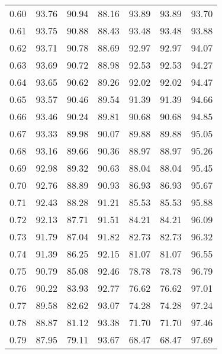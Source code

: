 \begin{tabular}{|c|c|c|c|c|c|c|}
      0.60 &     93.76 &     90.94 &      88.16 &   93.89 &      93.89 &         93.70 \\
      0.61 &     93.75 &     90.88 &      88.43 &   93.48 &      93.48 &         93.88 \\
      0.62 &     93.71 &     90.78 &      88.69 &   92.97 &      92.97 &         94.07 \\
      0.63 &     93.69 &     90.72 &      88.98 &   92.53 &      92.53 &         94.27 \\
      0.64 &     93.65 &     90.62 &      89.26 &   92.02 &      92.02 &         94.47 \\
      0.65 &     93.57 &     90.46 &      89.54 &   91.39 &      91.39 &         94.66 \\
      0.66 &     93.46 &     90.24 &      89.81 &   90.68 &      90.68 &         94.85 \\
      0.67 &     93.33 &     89.98 &      90.07 &   89.88 &      89.88 &         95.05 \\
      0.68 &     93.16 &     89.66 &      90.36 &   88.97 &      88.97 &         95.26 \\
      0.69 &     92.98 &     89.32 &      90.63 &   88.04 &      88.04 &         95.45 \\
      0.70 &     92.76 &     88.89 &      90.93 &   86.93 &      86.93 &         95.67 \\
      0.71 &     92.43 &     88.28 &      91.21 &   85.53 &      85.53 &         95.88 \\
      0.72 &     92.13 &     87.71 &      91.51 &   84.21 &      84.21 &         96.09 \\
      0.73 &     91.79 &     87.04 &      91.82 &   82.73 &      82.73 &         96.32 \\
      0.74 &     91.39 &     86.25 &      92.15 &   81.07 &      81.07 &         96.55 \\
      0.75 &     90.79 &     85.08 &      92.46 &   78.78 &      78.78 &         96.79 \\
      0.76 &     90.22 &     83.93 &      92.77 &   76.62 &      76.62 &         97.01 \\
      0.77 &     89.58 &     82.62 &      93.07 &   74.28 &      74.28 &         97.24 \\
      0.78 &     88.87 &     81.12 &      93.38 &   71.70 &      71.70 &         97.46 \\
      0.79 &     87.95 &     79.11 &      93.67 &   68.47 &      68.47 &         97.69 \\

\end{tabular}

